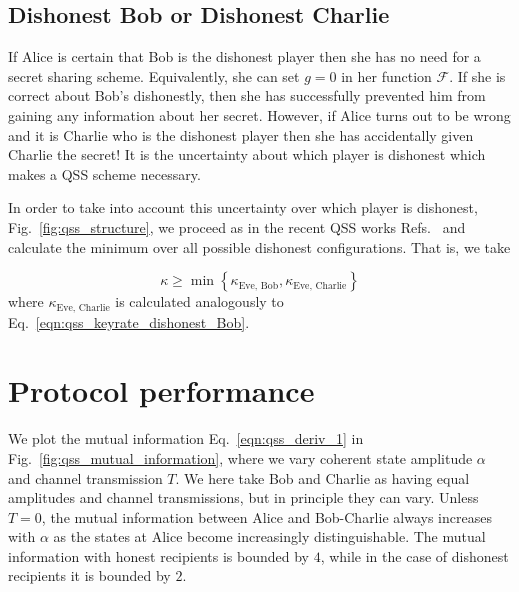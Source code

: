 \subsection{Dishonest Bob or Dishonest Charlie}
If Alice is certain that Bob is the dishonest player then she has no need for a secret sharing scheme. Equivalently, she can set $g=0$ in her function $\mathcal{F}$. If she is correct about Bob's dishonestly, then she has successfully prevented him from gaining any information about her secret. However, if Alice turns out to be wrong and it is Charlie who is the dishonest player then she has accidentally given Charlie the secret! It is the uncertainty about which player is dishonest which makes a QSS scheme necessary.

In order to take into account this uncertainty over which player is dishonest, Fig.~\ref{fig:qss_structure}, we proceed as in the recent QSS works Refs.~\cite{Kogias2017, Grice2019} and calculate the minimum over all possible dishonest configurations. That is, we take

\begin{equation}\label{eqn:qss_key_rate_min}
\kappa \ge \min \left\{\kappa_{\text{Eve, Bob}}, \kappa_{\text{Eve, Charlie}}\right\}
\end{equation}
where $\kappa_{\text{Eve, Charlie}}$ is calculated analogously to Eq.~\ref{eqn:qss_keyrate_dishonest_Bob}. 


\section{Protocol performance}\label{sec:qss_performance}



We plot the mutual information Eq.~\ref{eqn:qss_deriv_1} in Fig.~\ref{fig:qss_mutual_information}, where we vary coherent state amplitude $\alpha$ and channel transmission $T$. We here take Bob and Charlie as having equal amplitudes and channel transmissions, but in principle they can vary. Unless $T=0$, the mutual information between Alice and Bob-Charlie always increases with $\alpha$ as the states at Alice become increasingly distinguishable. The mutual information with honest recipients is bounded by $4$, while in the case of dishonest recipients it is bounded by $2$.

